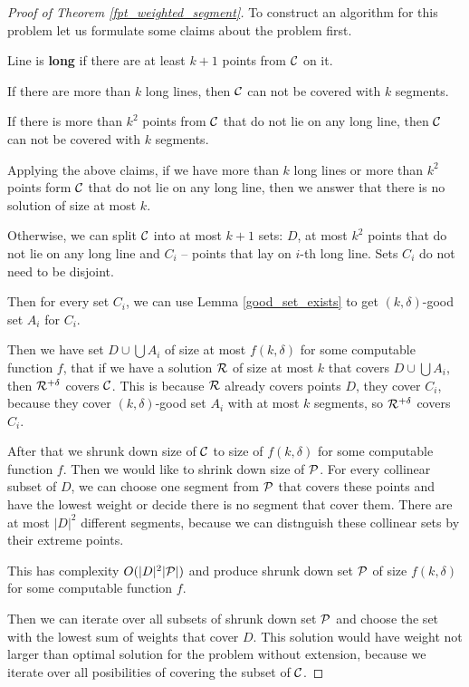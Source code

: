 \begin{proof}[Proof of Theorem \ref{fpt_weighted_segment}]

To construct an algorithm for this problem let us formulate
some claims about the problem first.

\begin{defi}
Line is \textbf{long} if there are at least $k+1$ points from $\mathcal{C}$ on it.
\end{defi}

\begin{claim}
If there are more than $k$ long lines, then 
$\mathcal{C}$ can not be covered with $k$ segments.
\end{claim}

\begin{claim}
If there is more than $k^2$ points from $\mathcal{C}$
that do not lie on any long line, then $\mathcal{C}$ can not be covered with $k$ segments.
\end{claim}

Applying the above claims, if we have more than $k$ long lines
or more than $k^2$ points form $\mathcal{C}$
that do not lie on any long line, then we answer that
there is no solution of size at most $k$.

Otherwise, we can split $\mathcal{C}$ into at most $k+1$ sets:
$D$, at most $k^2$ points that do not lie on any long line
and $C_i$ -- points
that lay on $i$-th long line.
Sets $C_i$ do not need to be disjoint.

Then for every set $C_i$, we can use Lemma \ref{good_set_exists}
to get $(k,\delta)$-good set $A_i$
for $C_i$.

Then we have set $D \cup \bigcup A_i$ of size at most $f(k, \delta)$
for some computable function $f$, that if we have a solution $\mathcal{R}$ of size at most $k$
that covers $D \cup \bigcup A_i$, then $\mathcal{R}^{+\delta}$ covers $\mathcal{C}$.
This is because
$\mathcal{R}$ already covers points $D$, they cover $C_i$, because
they cover $(k,\delta)$-good set $A_i$ with at most $k$ segments,
so $\mathcal{R}^{+\delta}$ covers $C_i$.

After that we shrunk down size of $\mathcal{C}$ to size of $f(k, \delta)$
for some computable function $f$.
Then we would like to shrink down size of $\mathcal{P}$.
For every collinear subset of $D$, we can choose one segment from
$\mathcal{P}$ that covers these points and have the lowest weight
or decide there is no segment that cover them.
There are at most $|D|^2$ different segments, because
we can distnguish these collinear sets by their extreme points.

This has complexity $O(|D|^2|\mathcal{P}|)$ and produce shrunk down
set $\mathcal{P}$ of size $f(k, \delta)$ for some computable function $f$.

Then we can iterate over all subsets of shrunk down set $\mathcal{P}$ and
choose the set with the lowest sum of weights that cover $D$. This solution
would have weight not larger than optimal solution
for the problem without extension, because we iterate
over all posibilities of covering the subset of $\mathcal{C}$.

\end{proof}

